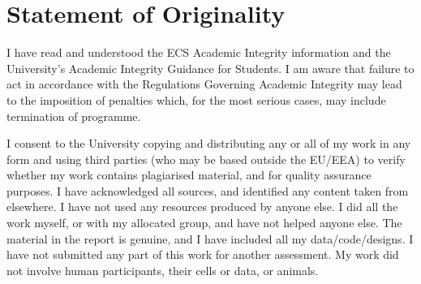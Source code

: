 \chapter*{Statement of Originality}{

    I have read and understood the ECS Academic Integrity information and the University’s Academic Integrity Guidance for Students.
    I am aware that failure to act in accordance with the Regulations Governing Academic Integrity may lead to the imposition of penalties which, for the most serious cases, may include termination of programme.
    
    I consent to the University copying and distributing any or all of my work in any form and using third parties (who may be based outside the EU/EEA) to verify whether my work contains plagiarised material, and for quality assurance purposes.
    I have acknowledged all sources, and identified any content taken from elsewhere.
    I have not used any resources produced by anyone else.
    I did all the work myself, or with my allocated group, and have not helped anyone else.
    The material in the report is genuine, and I have included all my data/code/designs.
    I have not submitted any part of this work for another assessment.
    My work did not involve human participants, their cells or data, or animals.
}